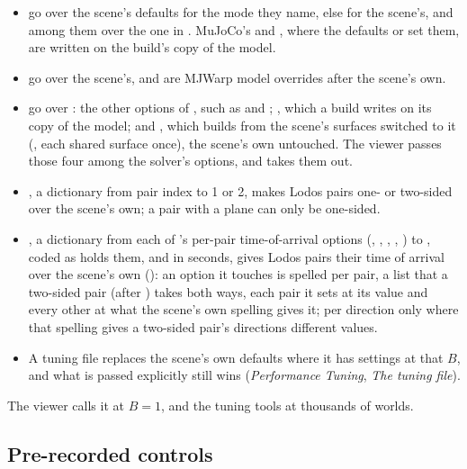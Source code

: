 \begin{itemize}
\item {} go over the scene's defaults for the mode they name, else for the scene's, and  among them over the one in . MuJoCo's  and , where the defaults or  set them, are written on the build's copy of the model.
\item {} go over the scene's, and  are MJWarp model overrides after the scene's own.
\item {} go over : the other options of , such as  and ; , which a build writes on its copy of the model; and , which builds from the scene's surfaces switched to it (, each shared surface once), the scene's own untouched. The viewer passes those four among the solver's options, and  takes them out.
\item {}, a dictionary from pair index to 1 or 2, makes Lodos pairs one- or two-sided over the scene's own; a pair with a plane can only be one-sided.
\item {}, a dictionary from each of 's per-pair time-of-arrival options (, , , , ) to , coded as  holds them, and  in seconds, gives Lodos pairs their time of arrival over the scene's own (): an option it touches is spelled per pair, a list that a two-sided pair (after ) takes both ways, each pair it sets at its value and every other at what the scene's own spelling gives it; per direction only where that spelling gives a two-sided pair's directions different values.
\item A tuning file replaces the scene's own defaults where it has settings at that $B$, and what is passed explicitly still wins (\emph{Performance Tuning}, \emph{The tuning file}).
\end{itemize}

The viewer calls it at $B = 1$, and the tuning tools at thousands of worlds.

\subsection{Pre-recorded controls}\label{sec:recorded}

